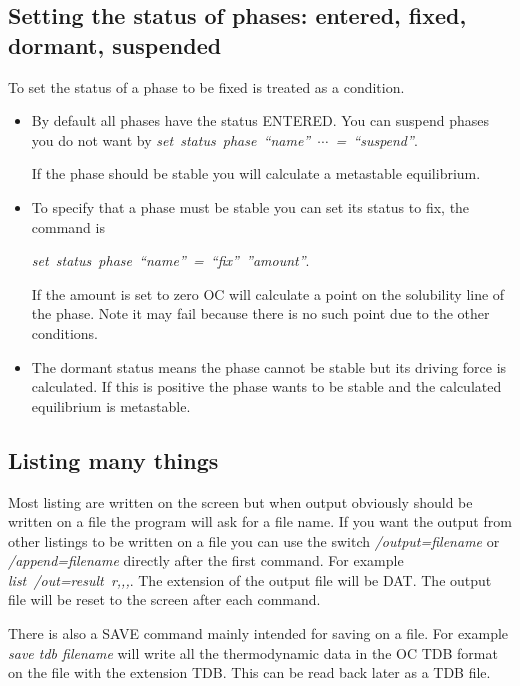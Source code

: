 \documentclass[12pt]{article}
\begin{document}
\subsection{Setting the status of phases: entered, fixed, dormant, suspended}

To set the status of a phase to be fixed is treated as a condition.

\begin{itemize}
\item By default all phases have the status ENTERED.  You can suspend
  phases you do not want by {\em
    set~status~phase~``name''~$\cdots$~=~``suspend''}.

  If the phase should be stable you will calculate a metastable equilibrium.

\item To specify that a phase must be stable you can set its status to
  fix, the command is

  {\em set~status~phase~``name''~=~``fix''~''amount''}.

  If the amount is set to zero OC will calculate a point on the
  solubility line of the phase.  Note it may fail because there is no
  such point due to the other conditions.

\item The dormant status means the phase cannot be stable but its
  driving force is calculated.  If this is positive the phase wants to
  be stable and the calculated equilibrium is metastable.
\end{itemize}

\subsection{Listing many things}

Most listing are written on the screen but when output obviously
should be written on a file the program will ask for a file name.  If
you want the output from other listings to be written on a file you
can use the switch {\em /output=filename} or {\em /append=filename}
directly after the first command.  For example {\em list~/out=result~r,,,}.
The extension of the output file will be DAT.  The output file will be
reset to the screen after each command.

There is also a SAVE command mainly intended for saving on a file.
For example {\em save tdb filename} will write all the thermodynamic
data in the OC TDB format on the file with the extension TDB.  This
can be read back later as a TDB file.
\end{document}
